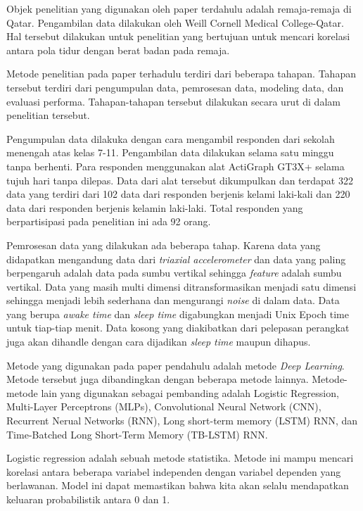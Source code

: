\documentclass[12pt, a4paper]{article}
\begin{document}
\begin{multicols}{2}
Objek penelitian yang digunakan oleh paper terdahulu adalah remaja-remaja di Qatar. Pengambilan data dilakukan oleh Weill Cornell Medical College-Qatar. Hal tersebut dilakukan untuk penelitian yang bertujuan untuk mencari korelasi antara pola tidur dengan berat badan pada remaja.

Metode penelitian pada paper terhadulu terdiri dari beberapa tahapan. Tahapan tersebut terdiri dari pengumpulan data, pemrosesan data, modeling data, dan evaluasi performa. Tahapan-tahapan tersebut dilakukan secara urut di dalam penelitian tersebut.

Pengumpulan data dilakuka dengan cara mengambil responden dari sekolah menengah atas kelas 7-11. Pengambilan data dilakukan selama satu minggu tanpa berhenti. Para responden menggunakan alat ActiGraph GT3X+ selama tujuh hari tanpa dilepas. Data dari alat tersebut dikumpulkan dan terdapat 322 data yang terdiri dari 102 data dari responden berjenis kelami laki-kali dan 220 data dari responden berjenis kelamin laki-laki. Total responden yang berpartisipasi pada penelitian ini ada 92
orang.

Pemrosesan data yang dilakukan ada beberapa tahap. Karena data yang didapatkan mengandung data dari \textit{triaxial accelerometer} dan data yang paling berpengaruh adalah data pada sumbu vertikal sehingga \textit{feature} adalah sumbu vertikal. Data yang masih multi dimensi ditransformasikan menjadi satu dimensi sehingga menjadi lebih sederhana dan mengurangi \textit{noise} di dalam data. Data yang berupa \textit{awake time} dan \textit{sleep time} digabungkan menjadi Unix
Epoch time untuk tiap-tiap menit. Data kosong yang diakibatkan dari pelepasan perangkat juga akan dihandle dengan cara dijadikan \textit{sleep time} maupun dihapus. 

Metode yang digunakan pada paper pendahulu adalah metode \textit{Deep Learning}. Metode tersebut juga dibandingkan dengan beberapa metode lainnya. Metode-metode lain yang digunakan sebagai pembanding adalah Logistic Regression, Multi-Layer Perceptrons (MLPs), Convolutional Neural Network (CNN), Recurrent Nerual Networks (RNN), Long short-term memory (LSTM) RNN, dan Time-Batched Long Short-Term Memory (TB-LSTM) RNN.

Logistic regression adalah sebuah metode statistika. Metode ini mampu mencari korelasi antara beberapa variabel independen dengan variabel dependen yang berlawanan. Model ini dapat memastikan bahwa kita akan selalu mendapatkan keluaran probabilistik antara 0 dan 1. \cite{Kleinbaum.2010}


\end{multicols}
\end{document}
